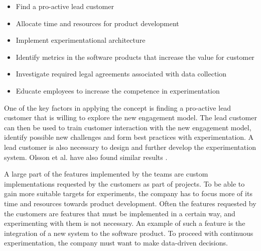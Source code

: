 \documentclass[english]{tktltiki2}
\theoremstyle{definition}
\theoremstyle{remark}
\begin{document}
\begin{itemize}
\item Find a pro-active lead customer
\item Allocate time and resources for product development
\item Implement experimentational architecture
\item Identify metrics in the software products that increase the value for customer
\item Investigate required legal agreements associated with data collection
\item Educate employees to increase the competence in experimentation
\end{itemize}



One of the key factors in applying the concept is finding a pro-active lead customer that is willing to explore the new engagement model. The lead customer can then be used to train customer interaction with the new engagement model, identify possible new challenges and form best practices with experimentation. A lead customer is also necessary to design and further develop the experimentation system. Olsson et al. have also found similar results \cite{olsson2012climbing}.

A large part of the features implemented by the teams are custom implementations requested by the customers as part of projects. To be able to gain more suitable targets for experiments, the company has to focus more of its time and resources towards product development. Often the features requested by the customers are features that must be implemented in a certain way, and experimenting with them is not necessary. An example of such a feature is the integration of a new system to the software product. To proceed with continuous experimentation, the company must want to make data-driven decisions.
\end{document}
